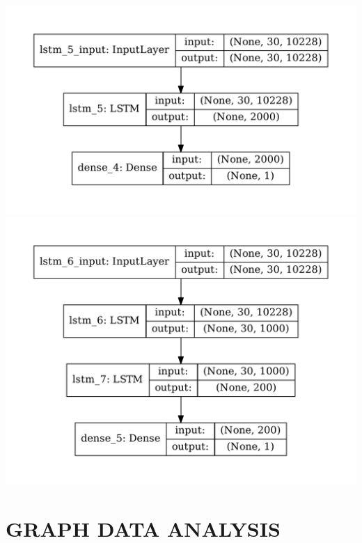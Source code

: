 \documentclass[12pt, a4paper]{article}
\begin{document}
\begin{multicols}{2}
{\centering
\includegraphics[width=\columnwidth]{src/stocks/lstm/one_layer}\\
\label{fig:lstm_structure_one}}
{\centering
\includegraphics[width=\columnwidth]{src/stocks/lstm/two_layer}\\
\label{fig:lstm_structure_two}}
\end{multicols}





\newpage
\section{GRAPH DATA ANALYSIS}
\end{document}
